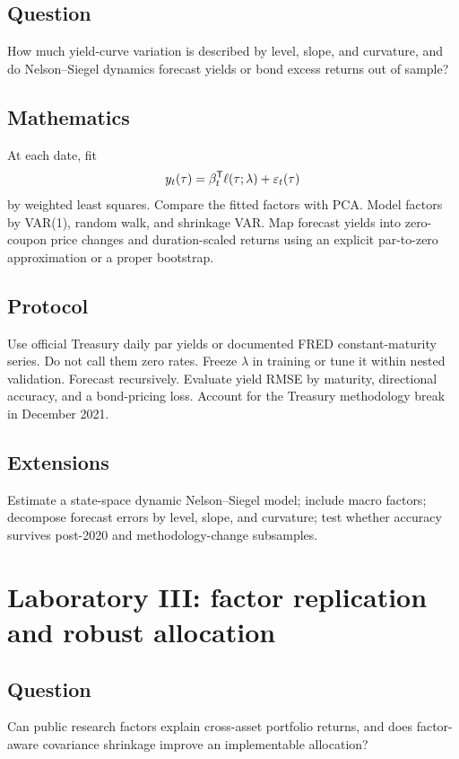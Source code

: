 \subsection*{Question}
How much yield-curve variation is described by level, slope, and curvature, and do
Nelson--Siegel dynamics forecast yields or bond excess returns out of sample?

\subsection*{Mathematics}
At each date, fit
\[
y_t(\tau)=\beta_t^\mathsf T\ell(\tau;\lambda)+\varepsilon_t(\tau)
\]
by weighted least squares. Compare the fitted factors with PCA. Model factors by
VAR(1), random walk, and shrinkage VAR. Map forecast yields into zero-coupon price
changes and duration-scaled returns using an explicit par-to-zero approximation or a
proper bootstrap.

\subsection*{Protocol}
Use official Treasury daily par yields or documented FRED constant-maturity series.
Do not call them zero rates. Freeze $\lambda$ in training or tune it within nested
validation. Forecast recursively. Evaluate yield RMSE by maturity, directional
accuracy, and a bond-pricing loss. Account for the Treasury methodology break in
December 2021.

\subsection*{Extensions}
Estimate a state-space dynamic Nelson--Siegel model; include macro factors; decompose
forecast errors by level, slope, and curvature; test whether accuracy survives
post-2020 and methodology-change subsamples.

\section{Laboratory III: factor replication and robust allocation}

\subsection*{Question}
Can public research factors explain cross-asset portfolio returns, and does
factor-aware covariance shrinkage improve an implementable allocation?

